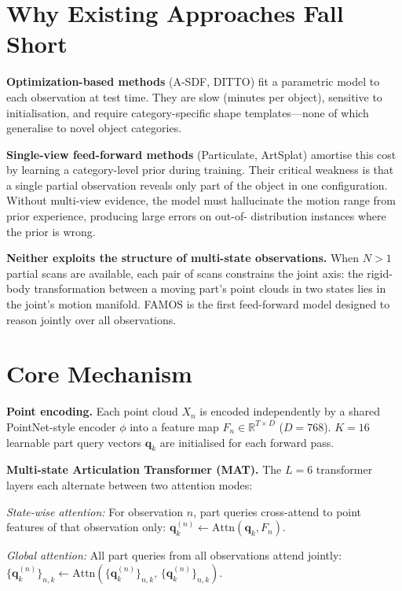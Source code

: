 \documentclass[10pt,twocolumn]{article}
\begin{document}
\section{Why Existing Approaches Fall Short}

\textbf{Optimization-based methods} (A-SDF, DITTO) fit a parametric model to
each observation at test time. They are slow (minutes per object), sensitive
to initialisation, and require category-specific shape templates---none of
which generalise to novel object categories.

\textbf{Single-view feed-forward methods} (Particulate, ArtSplat) amortise
this cost by learning a category-level prior during training. Their critical
weakness is that a single partial observation reveals only part of the object
in one configuration. Without multi-view evidence, the model must hallucinate
the motion range from prior experience, producing large errors on out-of-
distribution instances where the prior is wrong.

\textbf{Neither exploits the structure of multi-state observations.} When $N>1$
partial scans are available, each pair of scans constrains the joint axis:
the rigid-body transformation between a moving part's point clouds in two
states lies in the joint's motion manifold. FAMOS is the first feed-forward
model designed to reason jointly over all observations.

\section{Core Mechanism}

\textbf{Point encoding.} Each point cloud $X_n$ is encoded independently by
a shared PointNet-style encoder $\phi$ into a feature map $F_n \in \mathbb{R}^{T\times D}$
($D=768$). $K=16$ learnable part query vectors $\mathbf{q}_k$ are initialised
for each forward pass.

\textbf{Multi-state Articulation Transformer (MAT).} The $L=6$ transformer
layers each alternate between two attention modes:

\emph{State-wise attention:} For observation $n$, part queries cross-attend
to point features of that observation only:
$\mathbf{q}_k^{(n)} \leftarrow \text{Attn}(\mathbf{q}_k, F_n).$

\emph{Global attention:} All part queries from all observations attend
jointly:
$\{\mathbf{q}_k^{(n)}\}_{n,k} \leftarrow \text{Attn}\!\left(\{\mathbf{q}_k^{(n)}\}_{n,k},\,\{\mathbf{q}_k^{(n)}\}_{n,k}\right).$
\end{document}
